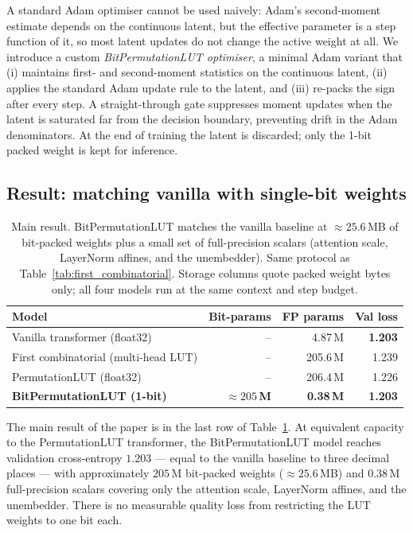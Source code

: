 \documentclass[11pt]{article}
\begin{document}
A standard Adam optimiser cannot be used naively: Adam's second-moment estimate depends on the continuous latent, but the effective parameter is a step function of it, so most latent updates do not change the active weight at all.
We introduce a custom \emph{BitPermutationLUT optimiser}, a minimal Adam variant that (i) maintains first- and second-moment statistics on the continuous latent, (ii) applies the standard Adam update rule to the latent, and (iii) re-packs the sign after every step.
A straight-through gate suppresses moment updates when the latent is saturated far from the decision boundary, preventing drift in the Adam denominators.
At the end of training the latent is discarded; only the 1-bit packed weight is kept for inference.

\subsection{Result: matching vanilla with single-bit weights}

\begin{table}[!t]
\caption{Main result. BitPermutationLUT matches the vanilla baseline at $\approx 25.6$\,MB of bit-packed weights plus a small set of full-precision scalars (attention scale, LayerNorm affines, and the unembedder). Same protocol as Table~\ref{tab:first_combinatorial}. Storage columns quote packed weight bytes only; all four models run at the same context and step budget.}
\label{tab:bitperm}
\centering
\begin{tabular}{lrrr}
\toprule
Model & Bit-params & FP params & Val loss \\
\midrule
Vanilla transformer (float32)          & --          & 4.87\,M    & \textbf{1.203} \\
First combinatorial (multi-head LUT)    & --          & 205.6\,M   & 1.239 \\
PermutationLUT (float32)                & --          & 206.4\,M   & 1.226 \\
\textbf{BitPermutationLUT (1-bit)}      & \textbf{$\approx 205$\,M}   & \textbf{0.38\,M}    & \textbf{1.203} \\
\bottomrule
\end{tabular}
\end{table}

The main result of the paper is in the last row of Table~\ref{tab:bitperm}.
At equivalent capacity to the PermutationLUT transformer, the BitPermutationLUT model reaches validation cross-entropy $1.203$ --- equal to the vanilla baseline to three decimal places --- with approximately $205$\,M bit-packed weights ($\approx 25.6$\,MB) and $0.38$\,M full-precision scalars covering only the attention scale, LayerNorm affines, and the unembedder.
There is no measurable quality loss from restricting the LUT weights to one bit each.
\end{document}
